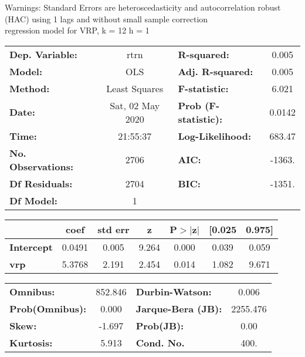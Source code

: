 Warnings: \newline
 [1] Standard Errors are heteroscedasticity and autocorrelation robust (HAC) using 1 lags and without small sample correction\\ 

regression model for VRP, k = 12 h = 1\begin{center}
\begin{tabular}{lclc}
\toprule
\textbf{Dep. Variable:}    &       rtrn       & \textbf{  R-squared:         } &     0.005   \\
\textbf{Model:}            &       OLS        & \textbf{  Adj. R-squared:    } &     0.005   \\
\textbf{Method:}           &  Least Squares   & \textbf{  F-statistic:       } &     6.021   \\
\textbf{Date:}             & Sat, 02 May 2020 & \textbf{  Prob (F-statistic):} &   0.0142    \\
\textbf{Time:}             &     21:55:37     & \textbf{  Log-Likelihood:    } &    683.47   \\
\textbf{No. Observations:} &        2706      & \textbf{  AIC:               } &    -1363.   \\
\textbf{Df Residuals:}     &        2704      & \textbf{  BIC:               } &    -1351.   \\
\textbf{Df Model:}         &           1      & \textbf{                     } &             \\
\bottomrule
\end{tabular}
\begin{tabular}{lcccccc}
                   & \textbf{coef} & \textbf{std err} & \textbf{z} & \textbf{P$> |$z$|$} & \textbf{[0.025} & \textbf{0.975]}  \\
\midrule
\textbf{Intercept} &       0.0491  &        0.005     &     9.264  &         0.000        &        0.039    &        0.059     \\
\textbf{vrp}       &       5.3768  &        2.191     &     2.454  &         0.014        &        1.082    &        9.671     \\
\bottomrule
\end{tabular}
\begin{tabular}{lclc}
\textbf{Omnibus:}       & 852.846 & \textbf{  Durbin-Watson:     } &    0.006  \\
\textbf{Prob(Omnibus):} &   0.000 & \textbf{  Jarque-Bera (JB):  } & 2255.476  \\
\textbf{Skew:}          &  -1.697 & \textbf{  Prob(JB):          } &     0.00  \\
\textbf{Kurtosis:}      &   5.913 & \textbf{  Cond. No.          } &     400.  \\
\bottomrule
\end{tabular}
\end{center}

